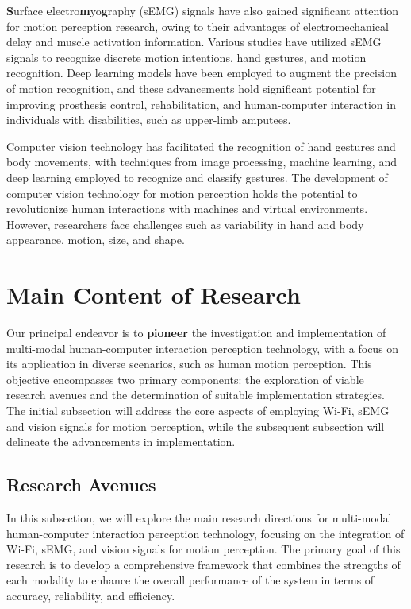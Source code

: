 \documentclass[12pt, a4paper]{article}
\begin{document}
\textbf{S}urface \textbf{e}lectro\textbf{m}yo\textbf{g}raphy (sEMG) signals have also gained significant attention for motion perception research, owing to their advantages of electromechanical delay and muscle activation information. Various studies have utilized sEMG signals to recognize discrete motion intentions, hand gestures, and motion recognition. Deep learning models have been employed to augment the precision of motion recognition, and these advancements hold significant potential for improving prosthesis control, rehabilitation, and human-computer interaction in individuals with disabilities, such as upper-limb amputees.

Computer vision technology has facilitated the recognition of hand gestures and body movements, with techniques from image processing, machine learning, and deep learning employed to recognize and classify gestures. The development of computer vision technology for motion perception holds the potential to revolutionize human interactions with machines and virtual environments. However, researchers face challenges such as variability in hand and body appearance, motion, size, and shape.\\

\newpage
\section{Main Content of Research}
Our principal endeavor is to \textbf{pioneer} the investigation and implementation of multi-modal human-computer interaction perception technology, with a focus on its application in diverse scenarios, such as human motion perception. This objective encompasses two primary components: the exploration of viable research avenues and the determination of suitable implementation strategies. The initial subsection will address the core aspects of employing Wi-Fi, sEMG and vision signals for motion perception, while the subsequent subsection will delineate the advancements in implementation.

\subsection{Research Avenues}
In this subsection, we will explore the main research directions for multi-modal human-computer interaction perception technology, focusing on the integration of Wi-Fi, sEMG, and vision signals for motion perception. The primary goal of this research is to develop a comprehensive framework that combines the strengths of each modality to enhance the overall performance of the system in terms of accuracy, reliability, and efficiency.
\end{document}
